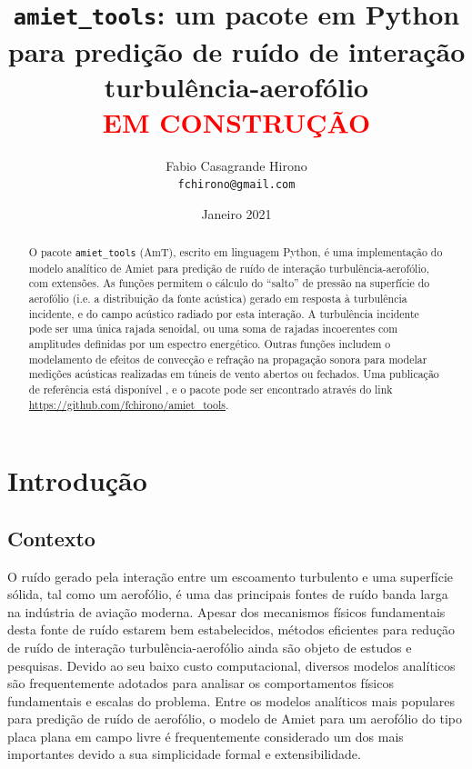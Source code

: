 \documentclass[a4paper, 11pt, twoside]{article}
\author{Fabio Casagrande Hirono \\ \texttt{fchirono@gmail.com}}
\title{\texttt{amiet\_tools}: um pacote em Python para predição de ruído de interação turbulência-aerofólio\\\textcolor{red}{EM CONSTRUÇÃO}}
\date{Janeiro 2021}
\begin{document}
\maketitle

\begin{abstract}
	O pacote \verb|amiet_tools| (AmT), escrito em linguagem Python, é uma implementação do modelo analítico de Amiet \cite{Amiet75} para predição de ruído de interação turbulência-aerofólio, com extensões. As funções permitem o cálculo do ``salto'' de pressão na superfície do aerofólio (i.e. a distribuição da fonte acústica) gerado em resposta à turbulência incidente, e do campo acústico radiado por esta interação. A turbulência incidente pode ser uma única rajada senoidal, ou uma soma de rajadas incoerentes com amplitudes definidas por um espectro energético. Outras funções includem o modelamento de efeitos de convecção e refração na propagação sonora para modelar medições acústicas realizadas em túneis de vento abertos ou fechados. Uma publicação de referência está disponível \cite{Casagrande_etal2020}, e o pacote pode ser encontrado através do link \url{https://github.com/fchirono/amiet_tools}.
\end{abstract}

\section{Introdução}

\subsection{Contexto}

O ruído gerado pela interação entre um escoamento turbulento e uma superfície sólida, tal como um aerofólio, é uma das principais fontes de ruído banda larga na indústria de aviação moderna. Apesar dos mecanismos físicos fundamentais desta fonte de ruído estarem bem estabelecidos, métodos eficientes para redução de ruído de interação turbulência-aerofólio ainda são objeto de estudos e pesquisas. Devido ao seu baixo custo computacional, diversos modelos analíticos são frequentemente adotados para analisar os comportamentos físicos fundamentais e escalas do problema. Entre os modelos analíticos mais populares para predição de ruído de aerofólio, o modelo de Amiet \cite{Amiet75} para um aerofólio do tipo placa plana em campo livre é frequentemente considerado um dos mais importantes devido a sua simplicidade formal e extensibilidade.
\end{document}
